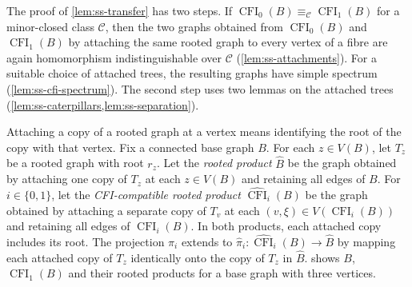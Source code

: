 \documentclass[11pt,a4paper]{article}
\theoremstyle{plain}
\theoremstyle{definition}
\DeclareMathOperator{\CFI}{CFI}
\begin{document}
The proof of \cref{lem:ss-transfer} has two steps.
If $\CFI_0(B)\equiv_{\mathcal C}\CFI_1(B)$ for a minor-closed class
$\mathcal C$, then the two graphs obtained from $\CFI_0(B)$ and
$\CFI_1(B)$ by attaching the same rooted graph to every vertex of a
fibre are again homomorphism indistinguishable over $\mathcal C$
(\cref{lem:ss-attachments}).
For a suitable choice of attached trees, the resulting graphs have
simple spectrum (\cref{lem:ss-cfi-spectrum}).
The second step uses two lemmas on the attached trees
(\cref{lem:ss-caterpillars,lem:ss-separation}).

Attaching a copy of a rooted graph at a vertex means identifying the
root of the copy with that vertex.
Fix a connected base graph $B$.
For each $z\in V(B)$, let $T_z$ be a rooted graph with root $r_z$.
Let the \emph{rooted product} $\widehat B$ be the graph obtained by
attaching one copy of $T_z$ at each $z\in V(B)$
and retaining all edges of $B$.
For $i\in\{0,1\}$, let the \emph{CFI-compatible rooted product}
$\widehat{\CFI}_i(B)$ be the graph obtained by attaching a separate copy
of $T_v$ at each $(v,\xi)\in V(\CFI_i(B))$ and retaining all edges of $\CFI_i(B)$.
In both products, each attached copy includes its root.
The projection $\pi_i$ extends to
$\widehat\pi_i:\widehat{\CFI}_i(B)\to\widehat B$ by mapping
each attached copy of $T_z$ identically onto the copy of $T_z$ in $\widehat B$.
 shows $B$, $\CFI_1(B)$ and their rooted
products for a base graph with three vertices.
\end{document}

